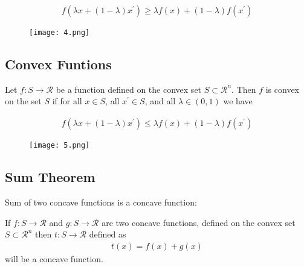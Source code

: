 \documentclass[12pt,a4paper]{article}
\begin{document}
\begin{align*}
f\left(\lambda x+(1-\lambda) x^{\prime}\right) \geq \lambda f(x)+(1-\lambda) f\left(x^{\prime}\right)
\end{align*}

\begin{figure}[H]
    \centering
    \texttt{[image: 4.png]}
\end{figure}

 \subsection{Convex Funtions}
 Let \(f: S \rightarrow \mathcal{R}\) be a function defined on the convex set \(S \subset \mathcal{R}^n\). Then \(f\) is convex on the set \(S\) if for all \(x \in S\), all \(x^{\prime} \in S\), and all \(\lambda \in(0,1)\) we have

\begin{align*}
f\left(\lambda x+(1-\lambda) x^{\prime}\right) \leq \lambda f(x)+(1-\lambda) f\left(x^{\prime}\right)
\end{align*}
 
\begin{figure}[H]
    \centering
    \texttt{[image: 5.png]}
\end{figure}

 \subsection{Sum Theorem} 
 Sum of two concave functions is a concave function:

 If \(f: S \rightarrow \mathcal{R}\) and \(g: S \rightarrow \mathcal{R}\) are two concave functions, defined on the convex set \(S \subset \mathcal{R}^n\) then
  \(t: S \rightarrow \mathcal{R}\) defined as
 \begin{align*}
  t(x)=f(x)+g(x)
 \end{align*}
 will be a concave function.
\end{document}
